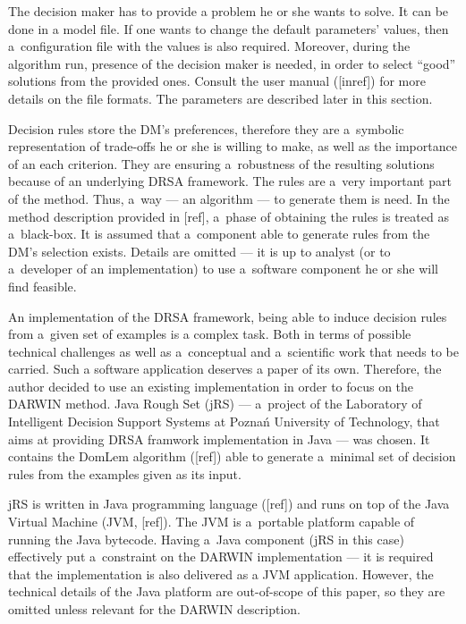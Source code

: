 The decision maker has to provide a problem he or she wants to solve. It can
be done in a model file. If one wants to change the default parameters'
values, then a~configuration file with the values is also required. Moreover,
during the algorithm run, presence of the decision maker is needed, in order
to select ``good'' solutions from the provided ones. Consult the user manual
([inref]) for more details on the file formats. The parameters are described
later in this section.

Decision rules store the DM's preferences, therefore they are a~symbolic
representation of trade-offs he or she is willing to make, as well as the
importance of an each criterion. They are ensuring a~robustness of the
resulting solutions because of an underlying DRSA framework. The rules are
a~very important part of the method. Thus, a~way --- an algorithm --- to
generate them is need. In the method description provided in [ref], a~phase of
obtaining the rules is treated as a~black-box. It is assumed that a~component
able to generate rules from the DM's selection exists. Details are omitted ---
it is up to analyst (or to a~developer of an implementation) to use a~software
component he or she will find feasible.

An implementation of the DRSA framework, being able to induce decision rules
from a~given set of examples is a complex task. Both in terms of possible
technical challenges as well as a~conceptual and a~scientific work that needs
to be carried. Such a software application deserves a paper of its
own. Therefore, the author decided to use an existing implementation in order
to focus on the DARWIN method. Java Rough Set (jRS) --- a~project of the
Laboratory of Intelligent Decision Support Systems at Poznań University of
Technology, that aims at providing DRSA framwork implementation in Java ---
was chosen. It contains the DomLem algorithm ([ref]) able to generate
a~minimal set of decision rules from the examples given as its input.

jRS is written in Java programming language ([ref]) and runs on top of the
Java Virtual Machine (JVM, [ref]). The JVM is a~portable platform capable of
running the Java bytecode. Having a~Java component (jRS in this case)
effectively put a~constraint on the DARWIN implementation --- it is required
that the implementation is also delivered as a JVM application. However, the
technical details of the Java platform are out-of-scope of this paper, so they
are omitted unless relevant for the DARWIN description.

